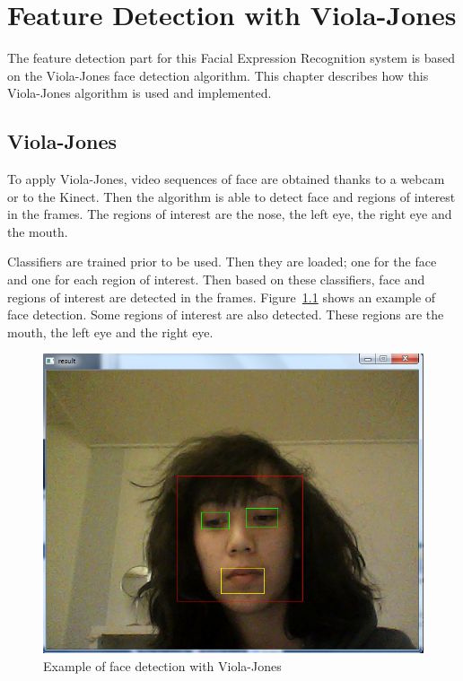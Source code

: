 \chapter{Feature Detection with Viola-Jones}
\label{chap:implementation_violajones}

\noindent The feature detection part for this Facial Expression Recognition system is based on the Viola-Jones face detection algorithm. This chapter describes how this Viola-Jones algorithm is used and implemented.
\newline

\section{Viola-Jones}

\vspace{\baselineskip}
\noindent To apply Viola-Jones, video sequences of face are obtained thanks to a webcam or to the Kinect. Then the algorithm is able to detect face and regions of interest in the frames. The regions of interest are the nose, the left eye, the right eye and the mouth. 
\newline

\noindent Classifiers are trained prior to be used. Then they are loaded; one for the face and one for each region of interest. Then based on these classifiers, face and regions of interest are detected in the frames. Figure~\ref{violajones_implementation_example} shows an example of face detection. Some regions of interest are also detected. These regions are the mouth, the left eye and the right eye.
\newline

\begin{figure}[!h]
\begin{center}
\noindent \includegraphics[scale=0.4]{figures/violajones_implementation_example} 
\newline
\caption{Example of face detection with Viola-Jones}
\label{violajones_implementation_example}
\end{center} 
\end{figure}